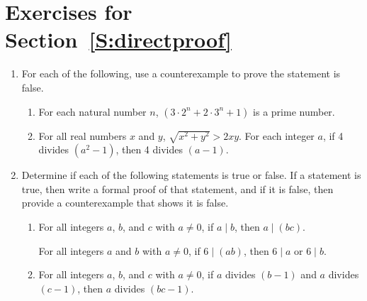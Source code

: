\section*{Exercises for Section~\ref{S:directproof}}

\begin{enumerate}
  \xitem Prove each of the following statements:  \label{exer:sec31-prove}
\begin{enumerate}
  \item For all integers  $a$, $b$, and  $c$   with $a \ne 0$,  if  $a \mid b$ and $a \mid c$, then $a \mid \left(b-c \right) $.\label{exer:sec31-provea}
  \item For each $n \in \Z$, if  $n$ is an odd integer, then $ n^3 $ is an odd integer.
  \item For each integer $a$, if 4 divides $(a - 1)$, then 4 divides $\left( a^2 - 1 \right)$.
\end{enumerate}


\item For each of the following, use a counterexample to prove the statement is false.
\begin{enumerate}
  \yitem For each odd natural number $n$, if $n > 3$, then 3 divides $\left( n^2 - 1 \right)$.
  \item For each natural number $n$, $\left( 3 \cdot 2^n + 2 \cdot 3^n + 1 \right)$ is a prime number.
  \item For all real numbers $x$ and $y$, $\sqrt{x^2 + y^2} > 2xy$.
  \yitem For each integer $a$, if 4 divides $\left( a^2 - 1 \right)$, then 4 divides $(a - 1)$.
\end{enumerate}


\item Determine if each of the following statements is true or false.  If a statement is true, then write a formal proof of that statement, and if it is false, then provide a counterexample that shows it is false.
\label{exer:3truefalse}%

\begin{enumerate}
\item For all integers $a$, $b$, and $c$ with $a \ne 0$, if $ a \mid b $, then 
$ a \mid \left(bc \right) $.
\label{exer:divprod}%

\yitem For all integers $a$ and  $b$ with $a \ne 0$,  if $ 6 \mid \left(ab \right) $, then 
$ 6 \mid a$ or $ 6 \mid b$.

\item For all integers $a$, $b$, and $c$ with $a \ne 0$, if $a$ divides $(b - 1)$ and $a$ divides 
$(c - 1)$, then $a$ divides $(bc - 1)$.


\end{enumerate}
\end{enumerate}
